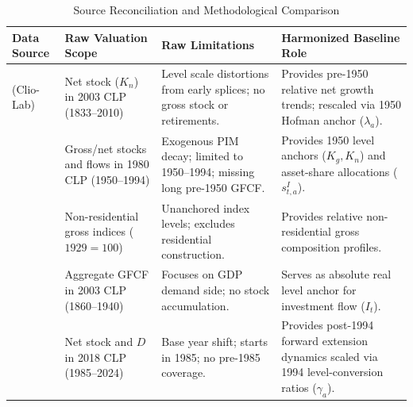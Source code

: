 \begin{table}[htbp]
\centering
\caption{Source Reconciliation and Methodological Comparison}\label{tab:source_reconciliation}
\small
\begin{tabularx}{\textwidth}{p{3.2cm} p{3.5cm} p{4.2cm} p{4.2cm}}
\toprule
\textbf{Data Source} & \textbf{Raw Valuation Scope} & \textbf{Raw Limitations} & \textbf{Harmonized Baseline Role} \\
\midrule
\citet{DiazWagner2016} (Clio-Lab) & Net stock ($K_n$) in 2003 CLP (1833--2010) & Level scale distortions from early splices; no gross stock or retirements. & Provides pre-1950 relative net growth trends; rescaled via 1950 Hofman anchor ($\lambda_a$). \\
\citet{Hofman2000a} & Gross/net stocks and flows in 1980 CLP (1950--1994) & Exogenous PIM decay; limited to 1950--1994; missing long pre-1950 GFCF. & Provides 1950 level anchors ($K_g, K_n$) and asset-share allocations ($s_{t,a}^I$). \\
\citet{TafunellDucoing2016} & Non-residential gross indices ($1929=100$) & Unanchored index levels; excludes residential construction. & Provides relative non-residential gross composition profiles. \\
\citet{PerezEyzaguirre2019} & Aggregate GFCF in 2003 CLP (1860--1940) & Focuses on GDP demand side; no stock accumulation. & Serves as absolute real level anchor for investment flow ($I_t$). \\
\citet{BCCH2024} & Net stock and $D$ in 2018 CLP (1985--2024) & Base year shift; starts in 1985; no pre-1985 coverage. & Provides post-1994 forward extension dynamics scaled via 1994 level-conversion ratios ($\gamma_a$). \\
\bottomrule
\end{tabularx}
\end{table}
